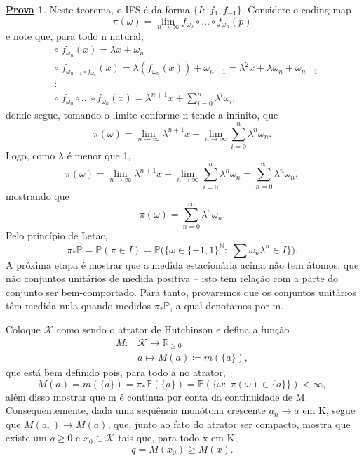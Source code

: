 \documentclass[12pt]{article}
\theoremstyle{definition}
\newtheorem*{proof*}{\underline{Prova}}
\begin{document}
\begin{proof*}
	Neste teorema, o IFS é da forma \(\{I:\; f_1, f_{-1}\}\). Considere o coding map
	\[
		\pi (\omega ) = \lim_{n\to \infty}f_{\omega_{0}}\circ \dotsc \circ f_{\omega_{n}}(p)
	\]
	e note que, para todo n natural,
	\begin{align*}
		 & \circ\; f_{\omega_{n}}(x) = \lambda x + \omega_{n}                                                                                             \\
		 & \circ\; f_{\omega_{n-1}\circ f_{\omega_{n}}}(x) = \lambda (f_{\omega_{n}}(x)) + \omega_{n-1} = \lambda^{2}x + \lambda\omega_{n} + \omega_{n-1} \\
		 & \vdots                                                                                                                                         \\
		 & \circ\; f_{\omega_{0}}\circ \dotsc \circ f_{\omega_{n}}(x) = \lambda^{n+1}x + \sum\limits_{i=0}^{n}\lambda^{i}\omega_{i},
	\end{align*}
	donde segue, tomando o limite conforme n tende a infinito, que
	\[
		\pi (\omega ) = \lim_{n\to \infty}\lambda^{n+1}x + \lim_{n\to \infty}\sum\limits_{i=0}^{n}\lambda^{n}\omega_{n}.
	\]
	Logo, como \(\lambda \) é menor que 1,
	\[
		\pi (\omega ) =\lim_{n\to \infty}\lambda^{n+1}x + \lim_{n\to \infty}\sum\limits_{i=0}^{n}\lambda^{n}\omega_{n} = \sum\limits_{n=0}^{\infty}\lambda ^{n}\omega_{n},
	\]
	mostrando que
	\[
		\pi (\omega ) = \sum\limits_{n=0}^{\infty}\lambda^{n}\omega_{n}.
	\]
	Pelo princípio de Letac,
	\[
		\pi_{*}\mathbb{P} = \mathbb{P}(\pi \in I) = \mathbb{P}\biggl(\biggl\{\omega \in \{-1, 1\}^{\mathbb{N}}:\; \sum \omega_{n}\lambda ^{n}\in I\biggr\}\biggr).
	\]
	A próxima etapa é mostrar que a medida estacionária acima não tem átomos, que não conjuntos unitários de medida positiva -- isto tem relação com a parte do conjunto ser bem-comportado. Para tanto, provaremos que os conjuntos unitários têm medida nula quando medidos \(\pi_{*}\mathbb{P}\), a qual denotamos por m.

	Coloque \(\mathcal{K}\) como sendo o atrator de Hutchinson e defina a função
	\begin{align*}
		M: & \mathcal{K}\rightarrow\mathbb{R}_{\geq 0} \\
		   & a\longmapsto M(a)\coloneqq m(\{a\}),
	\end{align*}
	que está bem definido pois, para todo a no atrator,
	\[
		M(a) = m(\{a\}) = \pi_{*}\mathbb{P}(\{a\}) = \mathbb{P}(\{\omega :\; \pi (\omega )\in \{a\}\}) < \infty,
	\]
	além disso mostrar que m é contínua por conta da continuidade de M. Consequentemente, dada uma sequência monótona crescente \(a_{n}\to a\) em K, segue que \(M(a_{n})\to M(a)\), que, junto ao fato do atrator ser compacto, mostra que existe um \(q\geq0\) e \(x_{0}\in \mathcal{K}\) tais que, para todo x em K,
	\[
		q = M(x_{0}) \geq M(x).
	\]


\end{proof*}
\end{document}

